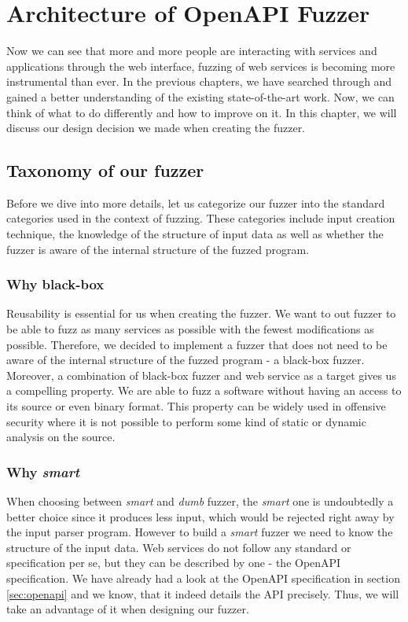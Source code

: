 \chapter{Architecture of OpenAPI Fuzzer}
Now we can see that more and more people are interacting with services and applications through the web interface, fuzzing of web services is becoming more instrumental than ever. In the previous chapters, we have searched through and gained a better understanding of the existing state-of-the-art work. Now, we can think of what to do differently and how to improve on it. In this chapter, we will discuss our design decision we made when creating the fuzzer.

\section{Taxonomy of our fuzzer}
Before we dive into more details, let us categorize our fuzzer into the standard categories used in the context of fuzzing. These categories include input creation technique, the knowledge of the structure of input data as well as whether the fuzzer is aware of the internal structure of the fuzzed program.

\subsection{Why black-box}
Reusability is essential for us when creating the fuzzer. We want to out fuzzer to be able to fuzz as many services as possible with the fewest modifications as possible. Therefore, we decided to implement a fuzzer that does not need to be aware of the internal structure of the fuzzed program - a black-box fuzzer. Moreover, a combination of black-box fuzzer and web service as a target gives us a compelling property. We are able to fuzz a software without having an access to its source or even binary format. This property can be widely used in offensive security where it is not possible to perform some kind of static or dynamic analysis on the source.

\subsection{Why \textit{smart}}
When choosing between \textit{smart} and \textit{dumb} fuzzer, the \textit{smart} one is undoubtedly a better choice since it produces less input, which would be rejected right away by the input parser program. However to build a \textit{smart} fuzzer we need to know the structure of the input data. Web services do not follow any standard or specification per se, but they can be described by one - the OpenAPI specification. We have already had a look at the OpenAPI specification in section \ref{sec:openapi} and we know, that it indeed details the API precisely. Thus, we will take an advantage of it when designing our fuzzer.

